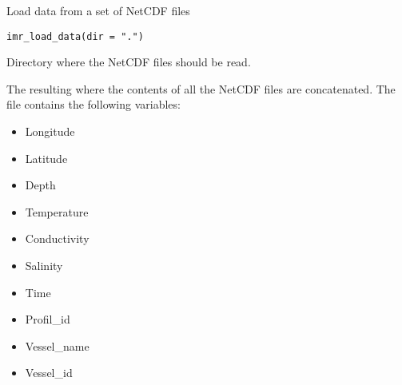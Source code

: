 %
\begin{Description}\relax
Load data from a set of NetCDF files
\end{Description}
%
\begin{Usage}
\begin{verbatim}
imr_load_data(dir = ".")
\end{verbatim}
\end{Usage}
%
\begin{Arguments}
\begin{ldescription}
\item[\code{dir}] 
Directory where the NetCDF files should be read.

\end{ldescription}
\end{Arguments}
%
\begin{Value}
The resulting  where the contents of all the NetCDF files
are concatenated. The file contains the following variables:
\begin{itemize}

\item Longitude
\item Latitude
\item Depth
\item Temperature
\item Conductivity
\item Salinity
\item Time
\item Profil\_id
\item Vessel\_name
\item Vessel\_id

\end{itemize}

\end{Value}
